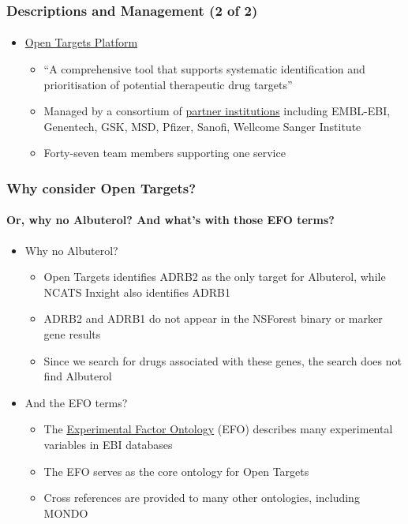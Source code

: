 \documentclass[aspectratio=169,xcolor=dvipsnames]{beamer}
\begin{document}
\begin{frame}
  \frametitle{Descriptions and Management (2 of 2)}
  \framesubtitle{}
  \begin{itemize}
  \item[]
    \href{https://platform-docs.opentargets.org/getting-started}{Open
      Targets Platform}
    \begin{itemize}
    \item ``A comprehensive tool that supports systematic
      identification and prioritisation of potential therapeutic drug
      targets''
    \item Managed by a consortium of
      \href{https://www.opentargets.org/partners}{partner
        institutions} including EMBL-EBI, Genentech, GSK, MSD, Pfizer,
      Sanofi, Wellcome Sanger Institute
    \item Forty-seven team members supporting one service
    \end{itemize}
    \vspace{4\baselineskip}
  \end{itemize}
\end{frame}

\begin{frame}
  \frametitle{Why consider Open Targets?}
  \framesubtitle{Or, why no Albuterol? And what's with those EFO terms?}
  \begin{itemize}
  \item[] Why no Albuterol?
    \begin{itemize}
    \item Open Targets identifies ADRB2 as the only target for
      Albuterol, while NCATS Inxight also identifies ADRB1
    \item ADRB2 and ADRB1 do not appear in the NSForest binary or
      marker gene results
    \item Since we search for drugs associated with these genes, the
      search does not find Albuterol
    \end{itemize}
    \vspace{0.5\baselineskip}
  \item[] And the EFO terms?
    \begin{itemize}
    \item The \href{https://www.ebi.ac.uk/efo/}{Experimental Factor
      Ontology} (EFO) describes many experimental variables in EBI
      databases
    \item The EFO serves as the core ontology for Open Targets
    \item Cross references are provided to many other ontologies,
      including MONDO
    \end{itemize}
  \end{itemize}
\end{frame}
\end{document}
